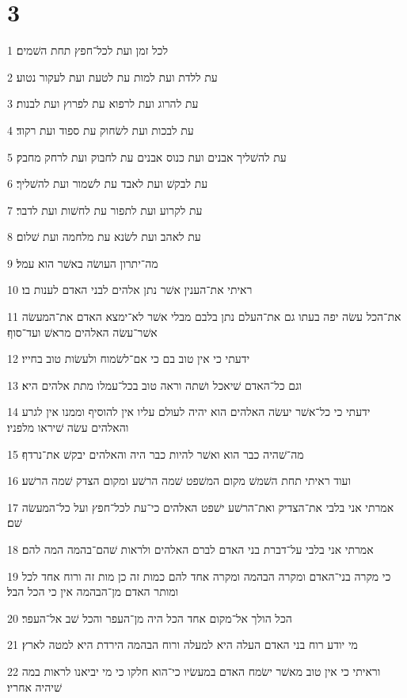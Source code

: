\chapter{3}

\par 1 לכל זמן ועת לכל־חפץ תחת השׁמים׃
\par 2 עת ללדת ועת למות עת לטעת ועת לעקור נטוע׃
\par 3 עת להרוג ועת לרפוא עת לפרוץ ועת לבנות׃
\par 4 עת לבכות ועת לשׂחוק עת ספוד ועת רקוד׃
\par 5 עת להשׁליך אבנים ועת כנוס אבנים עת לחבוק ועת לרחק מחבק׃
\par 6 עת לבקשׁ ועת לאבד עת לשׁמור ועת להשׁליך׃
\par 7 עת לקרוע ועת לתפור עת לחשׁות ועת לדבר׃
\par 8 עת לאהב ועת לשׂנא עת מלחמה ועת שׁלום׃
\par 9 מה־יתרון העושׂה באשׁר הוא עמל׃
\par 10 ראיתי את־הענין אשׁר נתן אלהים לבני האדם לענות בו׃
\par 11 את־הכל עשׂה יפה בעתו גם את־העלם נתן בלבם מבלי אשׁר לא־ימצא האדם את־המעשׂה אשׁר־עשׂה האלהים מראשׁ ועד־סוף׃
\par 12 ידעתי כי אין טוב בם כי אם־לשׂמוח ולעשׂות טוב בחייו׃
\par 13 וגם כל־האדם שׁיאכל ושׁתה וראה טוב בכל־עמלו מתת אלהים היא׃
\par 14 ידעתי כי כל־אשׁר יעשׂה האלהים הוא יהיה לעולם עליו אין להוסיף וממנו אין לגרע והאלהים עשׂה שׁיראו מלפניו׃
\par 15 מה־שׁהיה כבר הוא ואשׁר להיות כבר היה והאלהים יבקשׁ את־נרדף׃
\par 16 ועוד ראיתי תחת השׁמשׁ מקום המשׁפט שׁמה הרשׁע ומקום הצדק שׁמה הרשׁע׃
\par 17 אמרתי אני בלבי את־הצדיק ואת־הרשׁע ישׁפט האלהים כי־עת לכל־חפץ ועל כל־המעשׂה שׁם׃
\par 18 אמרתי אני בלבי על־דברת בני האדם לברם האלהים ולראות שׁהם־בהמה המה להם׃
\par 19 כי מקרה בני־האדם ומקרה הבהמה ומקרה אחד להם כמות זה כן מות זה ורוח אחד לכל ומותר האדם מן־הבהמה אין כי הכל הבל׃
\par 20 הכל הולך אל־מקום אחד הכל היה מן־העפר והכל שׁב אל־העפר׃
\par 21 מי יודע רוח בני האדם העלה היא למעלה ורוח הבהמה הירדת היא למטה לארץ׃
\par 22 וראיתי כי אין טוב מאשׁר ישׂמח האדם במעשׂיו כי־הוא חלקו כי מי יביאנו לראות במה שׁיהיה אחריו׃

